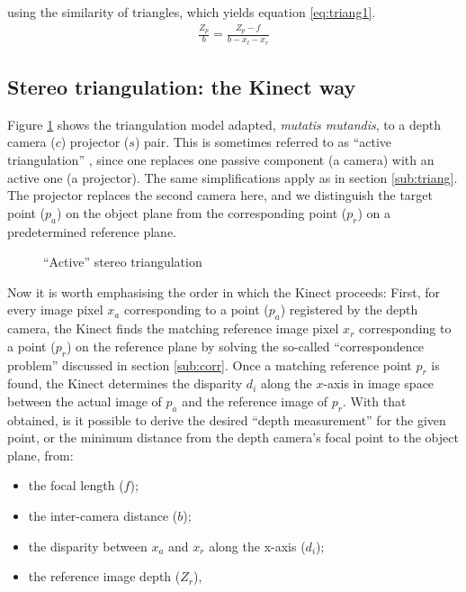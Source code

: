 using the similarity of triangles, which yields equation
\ref{eq:triang1}.
\begin{align} \label{eq:triang1}
    \frac{Z_p}{b} = \frac{Z_p - f}{b - x_l - x_r}
\end{align}


\subsection{Stereo triangulation: the Kinect way}
\label{sub:atriang}

Figure \ref{fig:atriang} shows the triangulation model adapted, \emph{mutatis
mutandis}, to a depth camera ($c$) projector ($s$) pair. This is sometimes
referred to as ``active triangulation'' \cite{alexander1987}, since one replaces
one passive component (a camera) with an active one (a projector). The same
simplifications apply as in section \ref{sub:triang}. The projector replaces the
second camera here, and we distinguish the target point ($p_a$) on the object
plane from the corresponding point ($p_r$) on a predetermined reference plane.

\begin{figure}[ht]
    \begin{center}
        
        \caption{``Active'' stereo triangulation}
        \label{fig:atriang}
    \end{center}
\end{figure}

Now it is worth emphasising the order in which the Kinect proceeds: First, for
every image pixel $x_a$ corresponding to a point ($p_a$) registered by the depth
camera, the Kinect finds the matching reference image pixel $x_r$ corresponding
to a point ($p_r$) on the reference plane by solving the so-called
``correspondence problem'' discussed in section \ref{sub:corr}. Once a matching
reference point $p_r$ is found, the Kinect determines the disparity $d_i$ along
the $x$-axis in image space between the actual image of $p_a$ and the reference
image of $p_r$. With that obtained, is it possible to derive the desired ``depth
measurement'' for the given point, or the minimum distance from the depth
camera's focal point to the object plane, from: 
\begin{itemize}

    \item the focal length ($f$);

    \item the inter-camera distance ($b$);

    \item the disparity between $x_a$ and $x_r$ along the x-axis ($d_i$);

    \item the reference image depth ($Z_r$),

\end{itemize}

